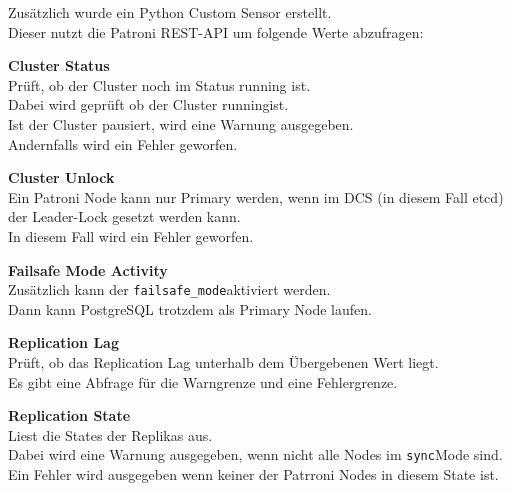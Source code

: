 \begin{flushleft}
    Zusätzlich wurde ein Python Custom Sensor erstellt.\\
    Dieser nutzt die Patroni REST-API um folgende Werte abzufragen:
    \begin{description}
        \item \textbf{Cluster Status}\hfill \\Prüft, ob der Cluster noch im Status running ist.\\Dabei wird geprüft ob der Cluster \guillemotleft running\guillemotright ist.\\Ist der Cluster pausiert, wird eine Warnung ausgegeben.\\Andernfalls wird ein Fehler geworfen.
        \item \textbf{Cluster Unlock}\hfill \\Ein Patroni Node kann nur Primary werden, wenn im DCS (in diesem Fall \gls{etcd}) der Leader-Lock gesetzt werden kann.\\In diesem Fall wird ein Fehler geworfen.
        \item \textbf{Failsafe Mode Activity}\hfill \\Zusätzlich kann der \guillemotleft\texttt{failsafe\_mode}\guillemotright aktiviert werden.\\Dann kann \Gls{PostgreSQL} trotzdem als Primary Node laufen\cite{KFMY83EB}.
        \item \textbf{Replication Lag}\hfill \\Prüft, ob das Replication Lag unterhalb dem Übergebenen Wert liegt.\\Es gibt eine Abfrage für die Warngrenze und eine Fehlergrenze.
        \item \textbf{Replication State}\hfill \\Liest die States der Replikas aus.\\Dabei wird eine Warnung ausgegeben, wenn nicht alle Nodes im \guillemotleft\texttt{sync}\guillemotright Mode sind.\\Ein Fehler wird ausgegeben wenn keiner der Patrroni Nodes in diesem State ist.
    \end{description}
\end{flushleft}
